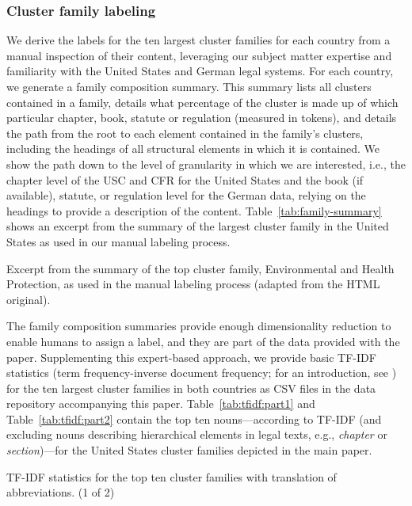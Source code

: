 \documentclass[utf8,sort&compress,numbers,square,table,hidelinks]{frontiers_suppmat} %
\begin{document}
\vspace*{12pt}
\subsubsection{Cluster family labeling}
We derive the labels for the ten largest cluster families for each country from a manual inspection of their content, 
leveraging our subject matter expertise and familiarity with the United States and German legal systems.
For each country, we generate a family composition summary. 
This summary lists all clusters contained in a family, details what percentage of the cluster is made up of which particular chapter, book, statute or regulation (measured in tokens), and details the path from the root to each element contained in the family's clusters, 
including the headings of all structural elements in which it is contained.
We show the path down to the level of granularity in which we are interested, i.e., the chapter level of the USC and CFR for the United States and the book (if available), statute, or regulation level for the German data, relying on the headings to provide a description of the content.
Table~\ref{tab:family-summary} shows an excerpt from the summary of the largest cluster family in the United States as used in our manual labeling process.

\begin{table}
	\caption{Excerpt from the summary of the top cluster family, Environmental and Health Protection, as used in the manual labeling process (adapted from the HTML original).
	}\label{tab:family-summary}
	
\end{table}

The family composition summaries provide enough dimensionality reduction to enable humans to assign a label, and they are part of the data provided with the paper. 
Supplementing this expert-based approach, 
we provide basic TF-IDF statistics (term frequency-inverse document frequency; for an introduction, see \cite{schutze2008}) for the ten largest cluster families in both countries as CSV files in the data repository accompanying this paper.
Table~\ref{tab:tfidf:part1} and Table~\ref{tab:tfidf:part2} contain the top ten nouns---according to TF-IDF (and excluding nouns describing hierarchical elements in legal texts, e.g., \emph{chapter} or \emph{section})---for the United States cluster families depicted in the main paper. 

\clearpage
 
\begin{table}
	\caption{TF-IDF statistics for the top ten cluster families with translation of abbreviations. (1 of 2)}\label{tab:tfidf:part1}
	
\end{table}
\end{document}
